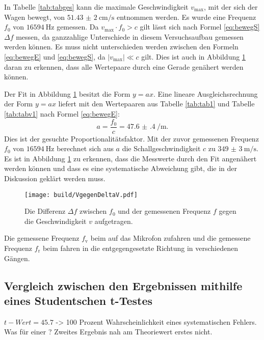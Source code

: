 In Tabelle \ref{tab:tabges} kann die maximale Geschwindigkeit $v_{\text{max}}$, mit der sich der Wagen bewegt, von $\SI{51,43(2)}{\centi\meter\per\second}$ entnommen werden. Es wurde eine Frequenz $f_0$ von $\SI{16594}{\hertz}$ gemessen. 
Da $v_{\text{max}} \cdot f_0 > c$ gilt lässt sich nach Formel \eqref{eq:bewegS} $\Delta f$ messen, da ganzzahlige Unterschiede in diesem Versuchsaufbau gemessen werden können.
Es muss nicht unterschieden werden zwischen den Formeln \eqref{eq:bewegE} und \eqref{eq:bewegS}, da $|v_\text{max}| \ll c$ gilt. Dies ist auch in Abbildung \ref{fig:Graph1} daran zu erkennen, dass alle Wertepaare durch eine Gerade genähert werden können.

Der Fit in Abbildung \ref{fig:Graph1} besitzt die Form $y=a x$. Eine lineare Ausgleichsrechnung der Form $y=a x$ liefert mit den Wertepaaren aus Tabelle \ref{tab:tab1} und Tabelle \ref{tab:tabv1} nach Formel \eqref{eq:bewegE}:
\begin{displaymath}
a = \frac{f_0}{c} = \SI{47.6(4)}{\per\meter}\text{.}
\end{displaymath}
Dies ist der gesuchte Proportionalitätsfaktor. Mit der zuvor gemessenen Frequenz $f_0$ von $\SI{16594}{\hertz}$ berechnet sich aus $a$ die Schallgeschwindigkeit $c$ zu $\SI{349(3)}{\meter\per\second}$.
Es ist in Abbildung \ref{fig:Graph1} zu erkennen, dass die Messwerte durch den Fit angenähert werden können und dass es eine systematische Abweichung gibt, die in der Diskussion geklärt werden muss.
\begin{figure}
	\centering
	\caption{Die Differenz $\Delta f $ zwischen $f_0$ und der gemessenen Frequenz $f$ gegen die Geschwindigkeit $v$ aufgetragen.}
	\texttt{[image: build/VgegenDeltaV.pdf]}
	\label{fig:Graph1}
\end{figure}
\begin{table}
	\caption{Die gemessene Frequenz $f_\text{v}$ beim auf das Mikrofon zufahren und die gemessene Frequenz $f_\text{r}$ beim fahren in die entgegengesetzte Richtung in verschiedenen Gängen.}
	\begin{minipage}{0.5\textwidth}
		\centering
		
	\end{minipage}
	\begin{minipage}{0.5\textwidth}
		\centering
		
	\end{minipage}
\end{table}

\subsection{Vergleich zwischen den Ergebnissen mithilfe eines Studentschen t-Testes}

$t-Wert = 45.7$ -> 100 Prozent Wahrscheinlichkeit eines systematischen Fehlers. Was für einer ? Zweites Ergebnis nah am Theoriewert erstes nicht.


